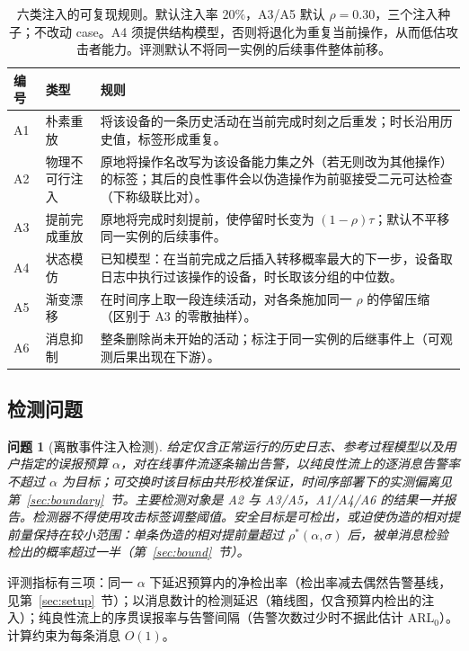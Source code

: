 \documentclass[manuscript,screen,review]{acmart}
\newtheorem{problem}{问题}
\begin{document}
\begin{table}[!t]
\renewcommand{\arraystretch}{1.12}
\caption{六类注入的可复现规则。默认注入率 $20\%$，{A3}/{A5} 默认 $\rho=0.30$，三个注入种子；不改动 case。{A4} 须提供结构模型，否则将退化为重复当前操作，从而低估攻击者能力。评测默认不将同一实例的后续事件整体前移。}
\label{tab:inject}
\centering
\small
\begin{tabular}{llp{7.4cm}}
\toprule
编号 & 类型 & 规则 \\
\midrule
{A1} & 朴素重放 & 将该设备的一条历史活动在当前完成时刻之后重发；时长沿用历史值，标签形成重复。 \\
{A2} & 物理不可行注入 & 原地将操作名改写为该设备能力集之外（若无则改为其他操作）的标签；其后的良性事件会以伪造操作为前驱接受二元可达检查（下称级联比对）。 \\
{A3} & 提前完成重放 & 原地将完成时刻提前，使停留时长变为 $(1-\rho)\tau$；默认不平移同一实例的后续事件。 \\
{A4} & 状态模仿 & 已知模型：在当前完成之后插入转移概率最大的下一步，设备取日志中执行过该操作的设备，时长取该分组的中位数。 \\
{A5} & 渐变漂移 & 在时间序上取一段连续活动，对各条施加同一 $\rho$ 的停留压缩（区别于 {A3} 的零散抽样）。 \\
{A6} & 消息抑制 & 整条删除尚未开始的活动；标注于同一实例的后继事件上（可观测后果出现在下游）。 \\
\bottomrule
\end{tabular}
\end{table}

\subsection{检测问题}
\label{sec:detproblem}

\begin{problem}[离散事件注入检测]
\label{prob:detect}
给定仅含正常运行的历史日志、参考过程模型以及用户指定的误报预算 $\alpha$，对在线事件流逐条输出告警，以纯良性流上的逐消息告警率不超过 $\alpha$ 为目标；可交换时该目标由共形校准保证，时间序部署下的实测偏离见第~\ref{sec:boundary}~节。主要检测对象是 {A2} 与 {A3}/{A5}，{A1}/{A4}/{A6} 的结果一并报告。检测器不得使用攻击标签调整阈值。安全目标是\emph{可检出，或迫使伪造的相对提前量保持在较小范围}：单条伪造的相对提前量超过 $\rho^*(\alpha,\sigma)$ 后，被单消息检验检出的概率超过一半（第~\ref{sec:bound}~节）。
\end{problem}

评测指标有三项：同一 $\alpha$ 下延迟预算内的净检出率（检出率减去偶然告警基线，见第~\ref{sec:setup}~节）；以消息数计的检测延迟（箱线图，仅含预算内检出的注入）；纯良性流上的序贯误报率与告警间隔（告警次数过少时不据此估计 $\mathrm{ARL}_0$）。计算约束为每条消息 $O(1)$。
\end{document}
